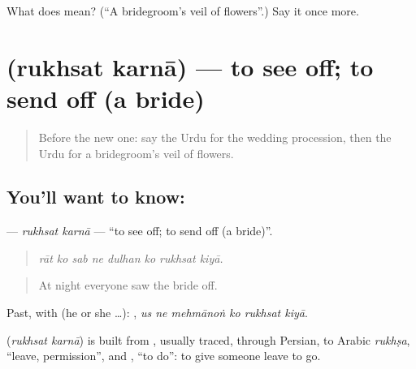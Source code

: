 \begin{tcolorbox}[breakable,colback=teal!4,colframe=teal!35!black,title={Before you move on}]
What does  mean? (\textquotedblleft{}A bridegroom's veil of flowers\textquotedblright{}.) Say it once more.
\end{tcolorbox}
\section[\texorpdfstring{\ur{رخصت} \ur{کرنا} (rukhsat karnā)}{رخصت کرنا (rukhsat karnā)}]{  (rukhsat karnā) — to see off; to send off (a bride)}

\label{lesson:UR-C487-rukhsat-karna}



\begin{quote}
Before the new one: say the Urdu for the wedding procession, then the Urdu for a bridegroom's veil of flowers.
\end{quote}

\subsection*{You'll want to know:  }
\textbf{ } — \emph{rukhsat karnā} — \textquotedblleft{}to see off; to send off (a bride)\textquotedblright{}.

\begin{quote}
       
\end{quote}

\begin{quote}
\emph{rāt ko sab ne dulhan ko rukhsat kiyā.}
\end{quote}

\begin{quote}
At night everyone saw the bride off.
\end{quote}

Past, with  (he or she …):      , \emph{us ne mehmānoṅ ko rukhsat kiyā}.

\begin{cousinweb}
\textbf{ } (\emph{rukhsat karnā}) is built from \textbf{}, usually traced, through Persian, to Arabic \emph{rukhṣa}, \textquotedblleft{}leave, permission\textquotedblright{}, and \textbf{}, \textquotedblleft{}to do\textquotedblright{}: to give someone leave to go.
\end{cousinweb}

